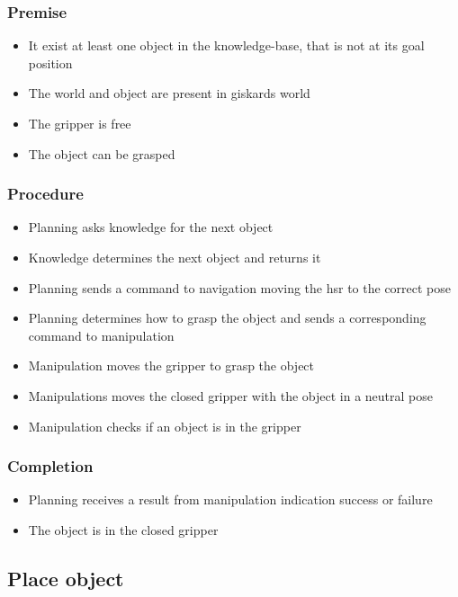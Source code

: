 \documentclass[main.tex]{subfiles}
\begin{document}
	\subsubsection{Premise}
	\begin{itemize}
		\item It exist at least one object in the knowledge-base, that is not at its goal position
		\item The world and object are present in giskards world
		\item The gripper is free
		\item The object can be grasped 
	\end{itemize} 
	
	\subsubsection{Procedure}
	\begin{itemize}			
		\item Planning asks knowledge for the next object
		\item Knowledge determines the next object and returns it
		\item Planning sends a command to navigation moving the hsr to the correct pose
		\item Planning determines how to grasp the object and sends a corresponding command to manipulation
		\item Manipulation moves the gripper to grasp the object
		\item Manipulations moves the closed gripper with the object in a neutral pose
		\item Manipulation checks if an object is in the gripper 				
	\end{itemize}
	
	\subsubsection{Completion}
	\begin{itemize}
		\item Planning receives a result from manipulation indication success or failure
		\item The object is in the closed gripper	
	\end{itemize}
	
	\subsection{Place object}
	
\end{document}
